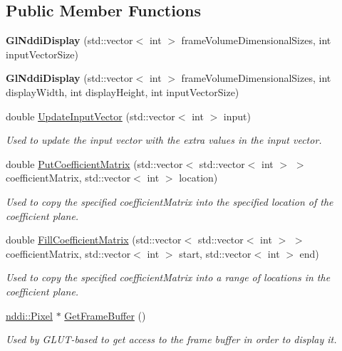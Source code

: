 \subsection*{Public Member Functions}
\begin{DoxyCompactItemize}
\item 
\hypertarget{class_gl_nddi_display_ab07d2c7d2009a330eaee9618e476d626}{
{\bfseries GlNddiDisplay} (std::vector$<$ int $>$ frameVolumeDimensionalSizes, int inputVectorSize)}
\label{class_gl_nddi_display_ab07d2c7d2009a330eaee9618e476d626}

\item 
\hypertarget{class_gl_nddi_display_abc739aab574293bdfb25e1ea545d013f}{
{\bfseries GlNddiDisplay} (std::vector$<$ int $>$ frameVolumeDimensionalSizes, int displayWidth, int displayHeight, int inputVectorSize)}
\label{class_gl_nddi_display_abc739aab574293bdfb25e1ea545d013f}

\item 
double \hyperlink{class_gl_nddi_display_ac6ed1d3cbad4ad321d3f5649a358717f}{UpdateInputVector} (std::vector$<$ int $>$ input)
\begin{DoxyCompactList}\small\item\em Used to update the input vector with the extra values in the input vector. \item\end{DoxyCompactList}\item 
double \hyperlink{class_gl_nddi_display_a94aecd7c31084a690b42617d76b77e8b}{PutCoefficientMatrix} (std::vector$<$ std::vector$<$ int $>$ $>$ coefficientMatrix, std::vector$<$ int $>$ location)
\begin{DoxyCompactList}\small\item\em Used to copy the specified coefficientMatrix into the specified location of the coefficient plane. \item\end{DoxyCompactList}\item 
double \hyperlink{class_gl_nddi_display_aeab9eda24d273e29bf51e3099e00a73a}{FillCoefficientMatrix} (std::vector$<$ std::vector$<$ int $>$ $>$ coefficientMatrix, std::vector$<$ int $>$ start, std::vector$<$ int $>$ end)
\begin{DoxyCompactList}\small\item\em Used to copy the specified coefficientMatrix into a range of locations in the coefficient plane. \item\end{DoxyCompactList}\item 
\hyperlink{unionnddi_1_1_pixel}{nddi::Pixel} $\ast$ \hyperlink{class_gl_nddi_display_a953c243969b0708d919be48b406d8e83}{GetFrameBuffer} ()
\begin{DoxyCompactList}\small\item\em Used by GLUT-\/based to get access to the frame buffer in order to display it. \item\end{DoxyCompactList}\end{DoxyCompactItemize}


